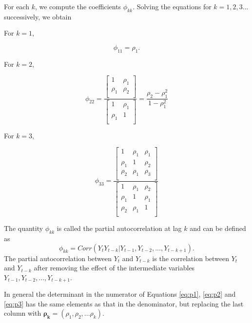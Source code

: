 \documentclass[]{book}
\begin{document}
For each \(k\), we compute the coefficients \(\phi_{kk}\). Solving the equations for \(k=1, 2, 3...\) successively, we obtain

For \(k=1\),

\begin{equation}
\label{eq:p1}
\phi_{11}=\rho_1.
\end{equation}

For \(k=2\),

\begin{equation}
\label{eq:p2}
\phi_{22}=\frac{\left[\begin{array}
{rr}
1 & \rho_1  \\
\rho_1 & \rho_2  \\
\end{array}\right]}{\left[\begin{array}
{rr}
1 & \rho_1  \\
\rho_1 & 1  \\
\end{array}\right]} = \frac{\rho_2-\rho_1^2}{1-\rho_1^2}
\end{equation}

For \(k=3\),

\begin{equation}
\label{eq:p3}
\phi_{33}=\frac{\left[\begin{array}
{rrr}
1 & \rho_1 & \rho_1  \\
\rho_1 & 1 & \rho_2  \\
\rho_2 & \rho_1 & \rho_3  \\
\end{array}\right]}{\left[\begin{array}
{rrr}
1 & \rho_1 & \rho_2  \\
\rho_1 & 1 & \rho_1  \\
\rho_2 & \rho_1 & 1  \\
\end{array}\right]}
\end{equation}

The quantity \(\phi_{kk}\) is called the partial autocorrelation at lag \(k\) and can be defined as
\[\phi_{kk}=Corr(Y_tY_{t-k}|Y_{t-1}, Y_{t-2},..., Y_{t-k+1}).\]
The partial autocorrelation between \(Y_t\) and \(Y_{t-k}\) is the correlation between \(Y_t\) and \(Y_{t-k}\) after removing the effect of the intermediate variables \(Y_{t-1}, Y_{t-2}, ..., Y_{t-k+1}\).

In general the determinant in the numerator of Equations \eqref{eq:p1}, \eqref{eq:p2} and \eqref{eq:p3} has the same elements as that in the denominator, but replacing the last column with \(\symbf{\rho_k}= (\rho_1, \rho_2,...\rho_k).\)
\end{document}

